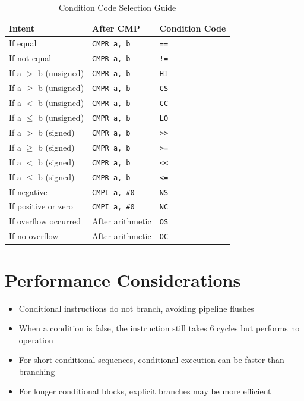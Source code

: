 \begin{table}[H]
	\centering
	\small
	\begin{tabular}{lll}
		\toprule
		\textbf{Intent}          & \textbf{After CMP}   & \textbf{Condition Code} \\
		\midrule
		If equal                 & \texttt{CMPR a, b}   & \texttt{==}             \\
		If not equal             & \texttt{CMPR a, b}   & \texttt{!=}             \\
		If a $>$ b (unsigned)    & \texttt{CMPR a, b}   & \texttt{HI}             \\
		If a $\geq$ b (unsigned) & \texttt{CMPR a, b}   & \texttt{CS}             \\
		If a $<$ b (unsigned)    & \texttt{CMPR a, b}   & \texttt{CC}             \\
		If a $\leq$ b (unsigned) & \texttt{CMPR a, b}   & \texttt{LO}             \\
		If a $>$ b (signed)      & \texttt{CMPR a, b}   & \texttt{>>}             \\
		If a $\geq$ b (signed)   & \texttt{CMPR a, b}   & \texttt{>=}             \\
		If a $<$ b (signed)      & \texttt{CMPR a, b}   & \texttt{<<}             \\
		If a $\leq$ b (signed)   & \texttt{CMPR a, b}   & \texttt{<=}             \\
		If negative              & \texttt{CMPI a, \#0} & \texttt{NS}             \\
		If positive or zero      & \texttt{CMPI a, \#0} & \texttt{NC}             \\
		If overflow occurred     & After arithmetic     & \texttt{OS}             \\
		If no overflow           & After arithmetic     & \texttt{OC}             \\
		\bottomrule
	\end{tabular}
	\caption{Condition Code Selection Guide}
	\label{tab:condition-selection}
\end{table}

\section{Performance Considerations}

\begin{itemize}
	\item Conditional instructions do not branch, avoiding pipeline flushes
	\item When a condition is false, the instruction still takes 6 cycles but performs no operation
	\item For short conditional sequences, conditional execution can be faster than branching
	\item For longer conditional blocks, explicit branches may be more efficient
\end{itemize}

